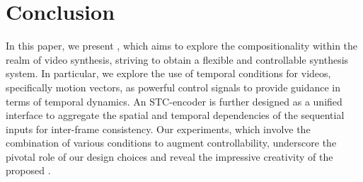 \section{Conclusion}
In this paper, we present \method, which aims to explore the compositionality within the realm of video synthesis, striving to obtain a flexible and controllable synthesis system.
In particular, we explore the use of temporal conditions for videos, specifically motion vectors, as powerful control signals to provide guidance in terms of temporal dynamics.
An STC-encoder is further designed as a unified interface to aggregate the spatial and temporal dependencies of the sequential inputs for inter-frame consistency.
Our experiments, which involve the combination of various conditions to augment controllability, underscore the pivotal role of our design choices and reveal the impressive creativity of the proposed \method.

{\small
}

\newpage
\onecolumn

